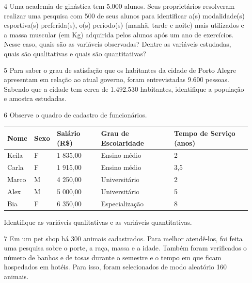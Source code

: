 \num{4} Uma academia de ginástica tem 5.000 alunos. Seus proprietários
resolveram realizar uma pesquisa com 500 de seus alunos para identificar
a(s) modalidade(s) esportiva(s) preferida(s), o(s) período(s) (manhã,
tarde e noite) mais utilizados e a massa muscular (em Kg) adquirida
pelos alunos após um ano de exercícios. Nesse caso, quais são as
variáveis observadas? Dentre as variáveis estudadas, quais são
qualitativas e quais são quantitativas?


\num{5} Para saber o grau de satisfação que os habitantes da cidade
de Porto Alegre apresentam em relação ao atual governo, foram
entrevistadas 9.600 pessoas. Sabendo que a cidade tem cerca de 1.492.530
habitantes, identifique a população e amostra estudadas.



\pagebreak
\num{6} Observe o quadro de cadastro de
funcionários.

\begin{longtable}[]{@{}lllll@{}}
\toprule
\textbf{Nome} & \textbf{Sexo} & \textbf{Salário (R\$)} & \textbf{Grau de
Escolaridade} & \textbf{Tempo de Serviço (anos)}\tabularnewline
\midrule
\endhead
Keila & F & 1 835,00 & Ensino médio & 2\tabularnewline
Carla & F & 1 915,00 & Ensino médio & 3,5\tabularnewline
Marco & M & 4 250,00 & Universitário & 2\tabularnewline
Alex & M & 5 000,00 & Universitário & 5\tabularnewline
Bia & F & 6 350,00 & Especialização & 8\tabularnewline
\bottomrule
\end{longtable}

Identifique as variáveis qualitativas e as variáveis quantitativas.


\num{7} Em um pet shop há 300 animais cadastrados. Para melhor atendê-los,
foi feita uma pesquisa sobre o porte, a raça, massa e a idade. Também
foram verificados o número de banhos e de tosas durante o semestre e o
tempo em que ficam hospedados em hotéis. Para isso, foram selecionados
de modo aleatório 160 animais.


